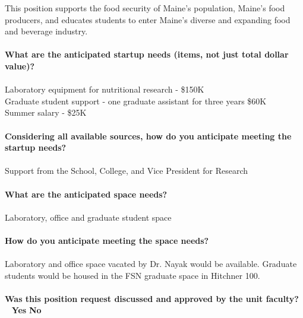 \documentclass[11pt]{article}
\begin{document}
This position supports the food security of Maine's population, Maine's food producers, and educates students to enter Maine's diverse and expanding food and beverage industry.
\\~\\
\vfill
\newpage\noindent\textbf{\rmfamily What are the anticipated startup needs (items, not just total dollar value)?}\\~\\
Laboratory equipment for nutritional research - \$150K \\
Graduate student support - one graduate assistant for three years \$60K\\
Summer salary - \$25K\\~\\
\vfill
\noindent\textbf{\rmfamily Considering all available sources, how do you anticipate meeting the startup needs?}\\~\\
Support from the School, College, and Vice President for Research\\~\\
\vfill
\noindent\textbf{\rmfamily What are the anticipated space needs?}\\~\\ Laboratory, office and graduate student space\\~\\
\vfill
\noindent\textbf{\rmfamily How do you anticipate meeting the space needs?} \\~\\
Laboratory and office space vacated by Dr. Nayak would be available. Graduate students would be housed in the FSN graduate space in Hitchner 100.\\~\\
\vfill
\noindent\textbf{\rmfamily Was this position request discussed and approved by the unit faculty?} \hfill ~ \hfill \textbf{\Large{\CrossedBox} \normalsize{Yes}} \hfill \textbf{\Large{\HollowBox} \normalsize{ No}}\\~\\%
\end{document}
